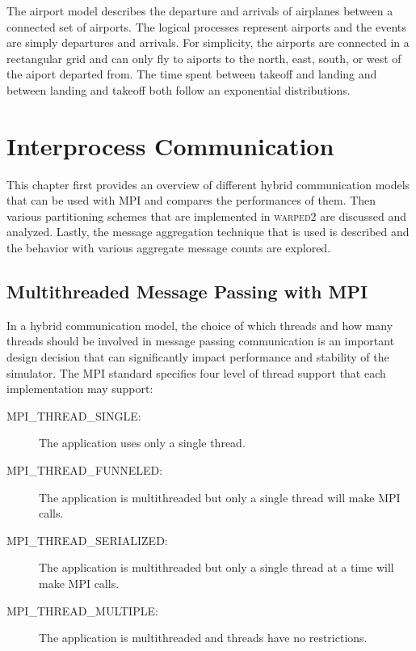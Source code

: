 \documentclass[11pt]{book}
\begin{document}
The airport model describes the departure and arrivals of airplanes between a connected
set of airports.  The logical processes represent airports and the events are simply
departures and arrivals.  For simplicity, the airports are connected in a rectangular grid
and can only fly to aiports to the north, east, south, or west of the aiport departed from.
The time spent between takeoff and landing and between landing and takeoff both follow an
exponential distributions.



\chapter[Communication]{Interprocess Communication} \label{partitioning_communication}

This chapter first provides an overview of different hybrid communication models that can be
used with MPI and compares the performances of them.  Then various partitioning schemes that are
implemented in \textsc{warped2} are discussed and analyzed.  Lastly, the message aggregation
technique that is used is described and the behavior with various aggregate message counts are
explored.

\section{Multithreaded Message Passing with MPI}

In a hybrid communication model, the choice of which threads and how many threads should be
involved in message passing communication is an important design decision that can significantly
impact performance and stability of the simulator.  The MPI standard specifies four level of
thread support that each implementation may support:

\begin{description}
    \item[MPI\_THREAD\_SINGLE:] The application uses only a single thread.  
    \item[MPI\_THREAD\_FUNNELED:] The application is multithreaded but only a single thread will
        make MPI calls.
    \item[MPI\_THREAD\_SERIALIZED:] The application is multithreaded but only a single thread at
        a time will make MPI calls.
    \item[MPI\_THREAD\_MULTIPLE:] The application is multithreaded and threads have no restrictions.
\end{description}
\end{document}
